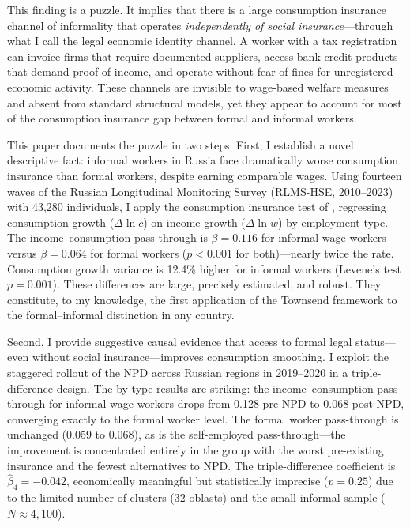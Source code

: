 \documentclass[12pt]{article}
\begin{document}
This finding is a puzzle. It implies that there is a large consumption insurance channel of informality that operates \textit{independently of social insurance}---through what I call the legal economic identity channel. A worker with a tax registration can invoice firms that require documented suppliers, access bank credit products that demand proof of income, and operate without fear of fines for unregistered economic activity. These channels are invisible to wage-based welfare measures and absent from standard structural models, yet they appear to account for most of the consumption insurance gap between formal and informal workers.

This paper documents the puzzle in two steps. First, I establish a novel descriptive fact: informal workers in Russia face dramatically worse consumption insurance than formal workers, despite earning comparable wages. Using fourteen waves of the Russian Longitudinal Monitoring Survey (RLMS-HSE, 2010--2023) with 43,280 individuals, I apply the consumption insurance test of \citet{Townsend1994}, regressing consumption growth ($\Delta \ln c$) on income growth ($\Delta \ln w$) by employment type. The income--consumption pass-through is $\beta = 0.116$ for informal wage workers versus $\beta = 0.064$ for formal workers ($p < 0.001$ for both)---nearly twice the rate. Consumption growth variance is 12.4\% higher for informal workers (Levene's test $p = 0.001$). These differences are large, precisely estimated, and robust. They constitute, to my knowledge, the first application of the Townsend framework to the formal--informal distinction in any country.

Second, I provide suggestive causal evidence that access to formal legal status---even without social insurance---improves consumption smoothing. I exploit the staggered rollout of the NPD across Russian regions in 2019--2020 in a triple-difference design. The by-type results are striking: the income--consumption pass-through for informal wage workers drops from 0.128 pre-NPD to 0.068 post-NPD, converging exactly to the formal worker level. The formal worker pass-through is unchanged (0.059 to 0.068), as is the self-employed pass-through---the improvement is concentrated entirely in the group with the worst pre-existing insurance and the fewest alternatives to NPD. The triple-difference coefficient is $\hat{\beta}_4 = -0.042$, economically meaningful but statistically imprecise ($p = 0.25$) due to the limited number of clusters (32 oblasts) and the small informal sample ($N \approx 4{,}100$).
\end{document}
